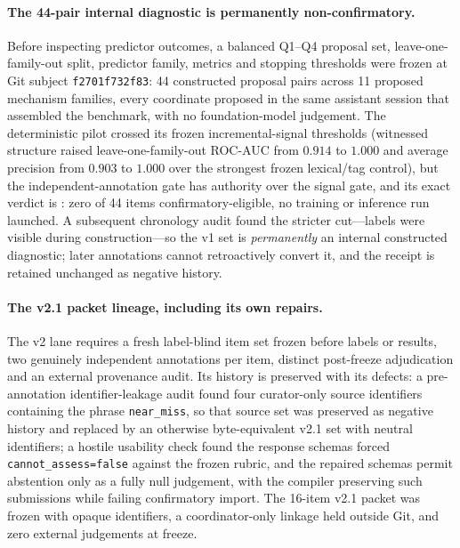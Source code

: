 \paragraph{The 44-pair internal diagnostic is permanently non-confirmatory.} Before inspecting predictor outcomes, a balanced Q1--Q4 proposal set, leave-one-family-out split, predictor family, metrics and stopping thresholds were frozen at Git subject \texttt{f2701f732f83}: 44 constructed proposal pairs across 11 proposed mechanism families, every coordinate proposed in the same assistant session that assembled the benchmark, with no foundation-model judgement. The deterministic pilot crossed its frozen incremental-signal thresholds (witnessed structure raised leave-one-family-out ROC-AUC from $0.914$ to $1.000$ and average precision from $0.903$ to $1.000$ over the strongest frozen lexical/tag control), but the independent-annotation gate has authority over the signal gate, and its exact verdict is : zero of 44 items confirmatory-eligible, no training or inference run launched. A subsequent chronology audit found the stricter cut---labels were visible during construction---so the v1 set is \emph{permanently} an internal constructed diagnostic; later annotations cannot retroactively convert it, and the receipt is retained unchanged as negative history.

\paragraph{The v2.1 packet lineage, including its own repairs.} The v2 lane requires a fresh label-blind item set frozen before labels or results, two genuinely independent annotations per item, distinct post-freeze adjudication and an external provenance audit. Its history is preserved with its defects: a pre-annotation identifier-leakage audit found four curator-only source identifiers containing the phrase \texttt{near\_miss}, so that source set was preserved as negative history and replaced by an otherwise byte-equivalent v2.1 set with neutral identifiers; a hostile usability check found the response schemas forced \texttt{cannot\_assess=false} against the frozen rubric, and the repaired schemas permit abstention only as a fully null judgement, with the compiler preserving such submissions while failing confirmatory import. The 16-item v2.1 packet was frozen with opaque identifiers, a coordinator-only linkage held outside Git, and zero external judgements at freeze.


